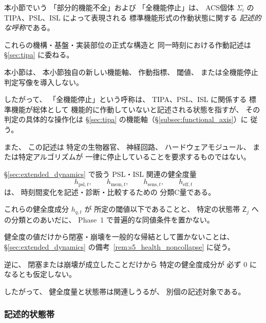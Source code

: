 \begin{remark}[機能作動記述の参照]
\label{rem:functional_axis_reference}
本小節でいう
「部分的機能不全」および
「全機能停止」は、
ACS個体 $\Sigma_i$ の
TIPA、PSL、ISL によって表現される
標準機能形式の作動状態に関する
\emph{記述的な呼称}である。

これらの機構・基盤・実装部位の正式な構造と
同一時刻における作動記述は
\S\ref{sec:tipa}
に委ねる。

本小節は、
本小節独自の新しい機能軸、
作動指標、
閾値、
または全機能停止判定写像を導入しない。

したがって、
「全機能停止」という呼称は、
TIPA、PSL、ISL に関係する
標準機能が総体として
機能的に作動していないと記述される状態を指すが、
その判定の具体的な操作化は
\S\ref{sec:tipa}
の機能軸（\S\ref{subsec:functional_axis}）に
従う。

また、
この記述は
特定の生物器官、
神経回路、
ハードウェアモジュール、
または特定アルゴリズムが
一律に停止していることを要求するものではない。
\end{remark}

\begin{remark}[健全度量と状態帯を同一視しない]
\label{rem:health_not_zone_identity}
\S\ref{sec:extended_dynamics} で扱う
PSL・ISL 関連の健全度量
\[
  h_{\mathrm{psl},t},
  \qquad
  h_{\mathrm{mem},t},
  \qquad
  h_{\mathrm{sens},t},
  \qquad
  h_{\mathrm{eff},t}
\]
は、
時刻間変化を記述・診断・比較するための
分類C量である。

これらの健全度成分 $h_{q,t}$ が
所定の閾値以下であることと、
特定の状態帯 $\mathsf{Z}_j$ への分類とのあいだに、
Phase~1 で普遍的な同値条件を置かない。

健全度の値だけから閉塞・崩壊を一般的な帰結として置かないことは、
\S\ref{sec:extended_dynamics} の備考~\ref{rem:s5_health_noncollapse} に従う。

逆に、
閉塞または崩壊が成立したことだけから
特定の健全度成分が
必ず $0$ になるとも仮定しない。

したがって、
健全度量と状態帯は関連しうるが、
別個の記述対象である。
\end{remark}

\subsubsection{記述的状態帯}

